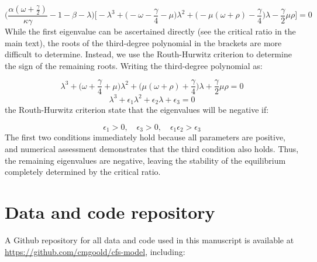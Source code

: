 \documentclass[9pt,twoside,lineno]{pnas-new}
\begin{document}
\begin{equation}
  \Big(\frac{\alpha(\omega + \frac{\gamma}{2})}{\kappa \gamma} - 1 - \beta - \lambda\Big) \Big[ - \lambda^3 + \big(-\omega - \frac{\gamma}{4} - \mu\big) \lambda^2 + \big(- \mu(\omega + \rho) - \frac{\gamma}{4}\big) \lambda - \frac{\gamma}{2} \mu \rho\Big] = 0
\end{equation}
%
While the first eigenvalue can be ascertained directly (see the critical ratio in the main text), the roots of the third-degree polynomial in the brackets are more difficult to determine. Instead, we use the Routh-Hurwitz criterion \cite{ottoday2011} to determine the sign of the remaining roots. Writing the third-degree polynomial as:

\begin{equation}
  \lambda^3 + \big(\omega + \frac{\gamma}{4} + \mu\big) \lambda^2 + \big(\mu(\omega + \rho) + \frac{\gamma}{4}\big) \lambda + \frac{\gamma}{2} \mu \rho = 0
\end{equation}
%
\begin{equation}
  \lambda^3 + \epsilon_{1} \lambda^2 + \epsilon_{2} \lambda + \epsilon_{3} = 0
\end{equation}
%
the Routh-Hurwitz criterion state that the eigenvalues will be negative if:

\begin{equation}
  \epsilon_{1} > 0, \quad
  \epsilon_{3} > 0, \quad
  \epsilon_{1} \epsilon_{2} > \epsilon_{3}
\end{equation}
%
The first two conditions immediately hold because all parameters are positive, and numerical assessment demonstrates that the third condition also holds. Thus, the remaining eigenvalues are negative, leaving the stability of the equilibrium completely determined by the critical ratio.
%

\section*{Data and code repository}
A Github repository for all data and code used in this manuscript is available at \href{https://github.com/cmgoold/cfs-model}{https://github.com/cmgoold/cfs-model}, including:



\end{document}
